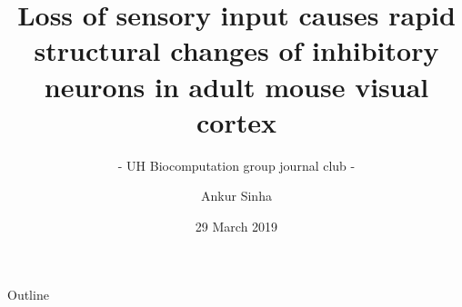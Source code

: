 
\usepackage{color}  

\usepackage{tipa}
\usepackage{tikz}
\usepackage{jneurosci}
\usepackage{subfig}  

\usepackage[default,osfigures,scale=0.95]{opensans}

\usepackage[normalem]{ulem}

\usepackage{hyperref}
\hypersetup{colorlinks,linkcolor=Green,urlcolor=links}

\usepackage{graphicx}

\usepackage{algorithmic}

\usepackage{textcomp}

\usepackage{wrapfig}



\title[Cortical rewiring]{Loss of sensory input causes rapid structural changes of inhibitory neurons in adult mouse visual cortex}
\subtitle{- UH Biocomputation group journal club -}
\author[Ankur Sinha]{Ankur Sinha}
\date[29/03/2019]{29 March 2019}



\begin{frame}
  \titlepage
\end{frame}

\begin{frame}{Outline}
  \small{\tableofcontents}
\end{frame}
